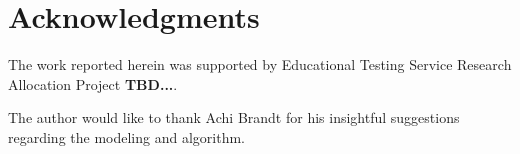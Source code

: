 \documentclass{article}
\begin{document}
\section{Acknowledgments}
The work reported herein was supported by Educational Testing Service Research Allocation Project {\bf TBD...}.

The author would like to thank Achi Brandt for his insightful suggestions regarding the modeling and algorithm.



\end{document}
